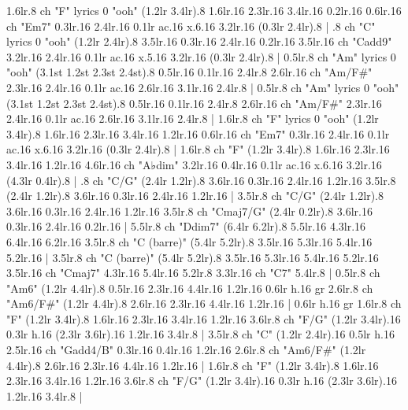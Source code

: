 1.6{lr}.8 {ch "F" lyrics 0 "ooh"} (1.2{lr} 3.4{lr}).8 1.6{lr}.16 2.3{lr}.16 3.4{lr}.16 0.2{lr}.16 0.6{lr}.16 {ch "Em7"} 0.3{lr}.16 2.4{lr}.16 0.1{lr ac}.16 x.6.16 3.2{lr}.16 (0.3{lr} 2.4{lr}).8 |
.8 {ch "C" lyrics 0 "ooh"} (1.2{lr} 2.4{lr}).8 3.5{lr}.16 0.3{lr}.16 2.4{lr}.16 0.2{lr}.16 3.5{lr}.16 {ch "Cadd9"} 3.2{lr}.16 2.4{lr}.16 0.1{lr ac}.16 x.5.16 3.2{lr}.16 (0.3{lr} 2.4{lr}).8 |
0.5{lr}.8 {ch "Am" lyrics 0 "ooh"} (3.1{st} 1.2{st} 2.3{st} 2.4{st}).8 0.5{lr}.16 0.1{lr}.16 2.4{lr}.8 2.6{lr}.16 {ch "Am/F#"} 2.3{lr}.16 2.4{lr}.16 0.1{lr ac}.16 2.6{lr}.16 3.1{lr}.16 2.4{lr}.8 |
0.5{lr}.8 {ch "Am" lyrics 0 "ooh"} (3.1{st} 1.2{st} 2.3{st} 2.4{st}).8 0.5{lr}.16 0.1{lr}.16 2.4{lr}.8 2.6{lr}.16 {ch "Am/F#"} 2.3{lr}.16 2.4{lr}.16 0.1{lr ac}.16 2.6{lr}.16 3.1{lr}.16 2.4{lr}.8 |
1.6{lr}.8 {ch "F" lyrics 0 "ooh"} (1.2{lr} 3.4{lr}).8 1.6{lr}.16 2.3{lr}.16 3.4{lr}.16 1.2{lr}.16 0.6{lr}.16 {ch "Em7"} 0.3{lr}.16 2.4{lr}.16 0.1{lr ac}.16 x.6.16 3.2{lr}.16 (0.3{lr} 2.4{lr}).8 |
1.6{lr}.8 {ch "F"} (1.2{lr} 3.4{lr}).8 1.6{lr}.16 2.3{lr}.16 3.4{lr}.16 1.2{lr}.16 4.6{lr}.16 {ch "A♭dim"} 3.2{lr}.16 0.4{lr}.16 0.1{lr ac}.16 x.6.16 3.2{lr}.16 (4.3{lr} 0.4{lr}).8 |
.8 {ch "C/G"} (2.4{lr} 1.2{lr}).8 3.6{lr}.16 0.3{lr}.16 2.4{lr}.16 1.2{lr}.16 3.5{lr}.8 (2.4{lr} 1.2{lr}).8 3.6{lr}.16 0.3{lr}.16 2.4{lr}.16 1.2{lr}.16 |
3.5{lr}.8 {ch "C/G"} (2.4{lr} 1.2{lr}).8 3.6{lr}.16 0.3{lr}.16 2.4{lr}.16 1.2{lr}.16 3.5{lr}.8 {ch "Cmaj7/G"} (2.4{lr} 0.2{lr}).8 3.6{lr}.16 0.3{lr}.16 2.4{lr}.16 0.2{lr}.16 |
5.5{lr}.8 {ch "Ddim7"} (6.4{lr} 6.2{lr}).8 5.5{lr}.16 4.3{lr}.16 6.4{lr}.16 6.2{lr}.16 3.5{lr}.8 {ch "C (barre)"} (5.4{lr} 5.2{lr}).8 3.5{lr}.16 5.3{lr}.16 5.4{lr}.16 5.2{lr}.16 |
3.5{lr}.8 {ch "C (barre)"} (5.4{lr} 5.2{lr}).8 3.5{lr}.16 5.3{lr}.16 5.4{lr}.16 5.2{lr}.16 3.5{lr}.16 {ch "Cmaj7"} 4.3{lr}.16 5.4{lr}.16 5.2{lr}.8 3.3{lr}.16 {ch "C7"} 5.4{lr}.8 |
0.5{lr}.8 {ch "Am6"} (1.2{lr} 4.4{lr}).8 0.5{lr}.16 2.3{lr}.16 4.4{lr}.16 1.2{lr}.16 0.6{lr h}.16 {gr} 2.6{lr}.8 {ch "Am6/F#"} (1.2{lr} 4.4{lr}).8 2.6{lr}.16 2.3{lr}.16 4.4{lr}.16 1.2{lr}.16 |
0.6{lr h}.16 {gr} 1.6{lr}.8 {ch "F"} (1.2{lr} 3.4{lr}).8 1.6{lr}.16 2.3{lr}.16 3.4{lr}.16 1.2{lr}.16 3.6{lr}.8 {ch "F/G"} (1.2{lr} 3.4{lr}).16 0.3{lr h}.16 (2.3{lr} 3.6{lr}).16 1.2{lr}.16 3.4{lr}.8 |
3.5{lr}.8 {ch "C"} (1.2{lr} 2.4{lr}).16 0.5{lr h}.16 2.5{lr}.16 {ch "Gadd4/B"} 0.3{lr}.16 0.4{lr}.16 1.2{lr}.16 2.6{lr}.8 {ch "Am6/F#"} (1.2{lr} 4.4{lr}).8 2.6{lr}.16 2.3{lr}.16 4.4{lr}.16 1.2{lr}.16 |
1.6{lr}.8 {ch "F"} (1.2{lr} 3.4{lr}).8 1.6{lr}.16 2.3{lr}.16 3.4{lr}.16 1.2{lr}.16 3.6{lr}.8 {ch "F/G"} (1.2{lr} 3.4{lr}).16 0.3{lr h}.16 (2.3{lr} 3.6{lr}).16 1.2{lr}.16 3.4{lr}.8 |
